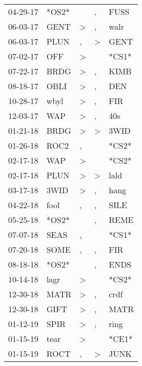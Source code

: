 \begin{supertabular}{lllll}
 04-29-17 &  *OS2* &                  &                , &   FUSS \\
 06-03-17 &   GENT &     \textgreater &                , &   walr \\
 06-03-17 &   PLUN &                , &     \textgreater &   GENT \\
 07-02-17 &    OFF &     \textgreater &                  &  *CS1* \\
 07-22-17 &   BRDG &     \textgreater &                , &   KIMB \\
 08-18-17 &   OBLI &     \textgreater &                , &    DEN \\
 10-28-17 &   wbyl &     \textgreater &                , &    FIR \\
 12-03-17 &    WAP &     \textgreater &                , &    40s \\
 01-21-18 &   BRDG &     \textgreater &     \textgreater &   3WID \\
 01-26-18 &   ROC2 &                , &                  &  *CS2* \\
 02-17-18 &    WAP &     \textgreater &                  &  *CS2* \\
 02-17-18 &   PLUN &     \textgreater &     \textgreater &   lald \\
 03-17-18 &   3WID &     \textgreater &                , &   hang \\
 04-22-18 &   fool &                , &                , &   SILE \\
 05-25-18 &  *OS2* &                  &                , &   REME \\
 07-07-18 &   SEAS &                , &                  &  *CS1* \\
 07-20-18 &   SOME &                , &                , &    FIR \\
 08-18-18 &  *OS2* &                  &                , &   ENDS \\
 10-14-18 &   lagr &     \textgreater &                  &  *CS2* \\
 12-30-18 &   MATR &     \textgreater &                , &   crdf \\
 12-30-18 &   GIFT &     \textgreater &                , &   MATR \\
 01-12-19 &   SPIR &     \textgreater &                , &   ring \\
 01-15-19 &   tear &     \textgreater &                  &  *CE1* \\
 01-15-19 &   ROCT &                , &     \textgreater &   JUNK \\

\end{supertabular}
